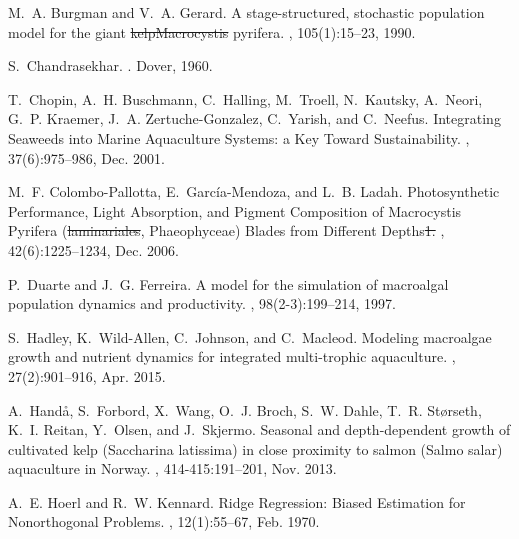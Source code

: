 \documentclass[ms,cpyr,lof,lot]{uathesis}
\providecommand{\DIFadd}[1]{{\protect\color{blue}\uwave{#1}}} %
\providecommand{\DIFdel}[1]{{\protect\color{red}\sout{#1}}}                      %
\providecommand{\DIFaddbegin}{} %
\providecommand{\DIFaddend}{} %
\providecommand{\DIFdelbegin}{} %
\providecommand{\DIFdelend}{} %
\newcommand{\DIFscaledelfig}{0.5}
\newlength{\DIFdelgraphicswidth} %
\newlength{\DIFdelgraphicsheight} %
\newcommand{\DIFaddincludegraphics}[2][]{{\color{blue}\fbox{\DIFOincludegraphics[#1]{#2}}}} %
\newcommand{\DIFdelincludegraphics}[2][]{%
\sbox{\DIFdelgraphicsbox}{\DIFOincludegraphics[#1]{#2}}%
\settoboxwidth{\DIFdelgraphicswidth}{\DIFdelgraphicsbox} %
\settoboxtotalheight{\DIFdelgraphicsheight}{\DIFdelgraphicsbox} %
\scalebox{\DIFscaledelfig}{%
\parbox[b]{\DIFdelgraphicswidth}{\usebox{\DIFdelgraphicsbox}\\[-\baselineskip] \rule{\DIFdelgraphicswidth}{0em}}\llap{\resizebox{\DIFdelgraphicswidth}{\DIFdelgraphicsheight}{%
\setlength{\unitlength}{\DIFdelgraphicswidth}%
\begin{picture}(1,1)%
\thicklines\linethickness{2pt} %
{\color[rgb]{1,0,0}\put(0,0){\framebox(1,1){}}}%
{\color[rgb]{1,0,0}\put(0,0){\line( 1,1){1}}}%
{\color[rgb]{1,0,0}\put(0,1){\line(1,-1){1}}}%
\end{picture}%
}\hspace*{3pt}}} %
} %
\DeclareRobustCommand{\DIFaddbegin}{\DIFOaddbegin \let\includegraphics\DIFaddincludegraphics} %
\DeclareRobustCommand{\DIFaddend}{\DIFOaddend \let\includegraphics\DIFOincludegraphics} %
\DeclareRobustCommand{\DIFdelbegin}{\DIFOdelbegin \let\includegraphics\DIFdelincludegraphics} %
\DeclareRobustCommand{\DIFdelend}{\DIFOaddend \let\includegraphics\DIFOincludegraphics} %
\begin{document}
\begin{thebibliography}{10}
M.~A. Burgman and V.~A. Gerard.
\newblock A stage-structured, stochastic population model for the giant \DIFaddbegin \DIFadd{kelp
  }\DIFaddend {\DIFdelbegin \DIFdel{kelpMacrocystis}\DIFdelend \DIFaddbegin \DIFadd{Macrocystis}\DIFaddend } pyrifera.
, 105(1):15--23, 1990.

S.~Chandrasekhar.
.
\newblock Dover, 1960.

T.~Chopin, A.~H. Buschmann, C.~Halling, M.~Troell, N.~Kautsky, A.~Neori, G.~P.
  Kraemer, J.~A. Zertuche-Gonzalez, C.~Yarish, and C.~Neefus.
\newblock Integrating {Seaweeds} into {Marine} {Aquaculture} {Systems}: a {Key}
  {Toward} {Sustainability}.
, 37(6):975--986, Dec. 2001.

M.~F. Colombo-Pallotta, E.~García-Mendoza, and L.~B. Ladah.
\newblock Photosynthetic {Performance}, {Light} {Absorption}, and {Pigment}
  {Composition} of {Macrocystis} {Pyrifera} (\DIFdelbegin \DIFdel{laminariales}\DIFdelend \DIFaddbegin {\DIFadd{Laminariales}}\DIFaddend , {Phaeophyceae})
  {Blades} from {Different} {Depths}\DIFdelbegin \DIFdel{1.
}\DIFdelend \DIFaddbegin \DIFadd{.
}\DIFaddend {}, 42(6):1225--1234, Dec. 2006.

P.~Duarte and J.~G. Ferreira.
\newblock A model for the simulation of macroalgal population dynamics and
  productivity.
, 98(2-3):199--214, 1997.

S.~Hadley, K.~Wild-Allen, C.~Johnson, and C.~Macleod.
\newblock Modeling macroalgae growth and nutrient dynamics for integrated
  multi-trophic aquaculture.
, 27(2):901--916, Apr. 2015.

A.~Handå, S.~Forbord, X.~Wang, O.~J. Broch, S.~W. Dahle, T.~R. Størseth,
  K.~I. Reitan, Y.~Olsen, and J.~Skjermo.
\newblock Seasonal and depth-dependent growth of cultivated kelp ({Saccharina}
  latissima) in close proximity to salmon ({Salmo} salar) aquaculture in
  {Norway}.
, 414-415:191--201, Nov. 2013.

A.~E. Hoerl and R.~W. Kennard.
\newblock Ridge {Regression}: {Biased} {Estimation} for {Nonorthogonal}
  {Problems}.
, 12(1):55--67, Feb. 1970.


\end{thebibliography}
\end{document}
